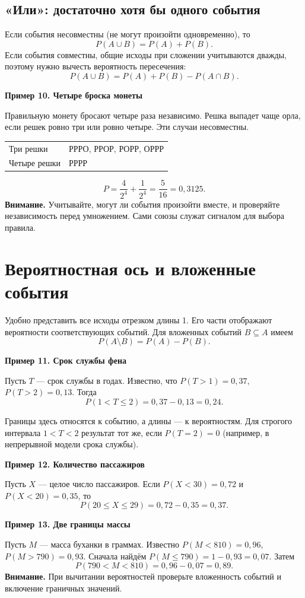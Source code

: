 \documentclass[a4paper,12pt]{article}
\newcommand{\example}[1]{\par\medskip\textcolor{darkaccent}{\textbf{#1}}\par}
\newcommand{\warning}[1]{\textcolor{warn}{\textbf{Внимание.}} #1}
\begin{document}
\subsection*{«Или»: достаточно хотя бы одного события}
Если события несовместны (не могут произойти одновременно), то
\[ P(A\cup B)=P(A)+P(B). \]
Если события совместны, общие исходы при сложении учитываются дважды, поэтому нужно вычесть вероятность пересечения:
\[ P(A\cup B)=P(A)+P(B)-P(A\cap B). \]
\example{Пример 10. Четыре броска монеты}
Правильную монету бросают четыре раза независимо. Решка выпадет чаще орла, если решек ровно три или ровно четыре. Эти случаи несовместны.
\begin{center}
\begin{tabular}{@{}ll@{}}
\toprule
Три решки & РРРО, РРОР, РОРР, ОРРР\\
Четыре решки & РРРР\\
\bottomrule
\end{tabular}
\end{center}
\[ P=\frac4{2^4}+\frac1{2^4}=\frac5{16}=0,3125. \]
\warning{Учитывайте, могут ли события произойти вместе, и проверяйте независимость перед умножением. Сами союзы служат сигналом для выбора правила.}

\clearpage
\section{Вероятностная ось и вложенные события}
Удобно представить все исходы отрезком длины 1. Его части отображают вероятности соответствующих событий. Для вложенных событий $B\subseteq A$ имеем
\[ P(A\setminus B)=P(A)-P(B). \]
\example{Пример 11. Срок службы фена}
Пусть $T$ --- срок службы в годах. Известно, что $P(T>1)=0,37$, $P(T>2)=0,13$. Тогда
\[ P(1<T\le2)=0,37-0,13=0,24. \]
\begin{center}
\end{center}
Границы здесь относятся к событию, а длины --- к вероятностям. Для строгого интервала $1<T<2$ результат тот же, если $P(T=2)=0$ (например, в непрерывной модели срока службы).
\example{Пример 12. Количество пассажиров}
Пусть $X$ --- целое число пассажиров. Если $P(X<30)=0,72$ и $P(X<20)=0,35$, то
\[ P(20\le X\le29)=0,72-0,35=0,37. \]
\example{Пример 13. Две границы массы}
Пусть $M$ --- масса буханки в граммах. Известно $P(M<810)=0,96$, $P(M>790)=0,93$. Сначала найдём $P(M\le790)=1-0,93=0,07$. Затем
\[ P(790<M<810)=0,96-0,07=0,89. \]
\warning{При вычитании вероятностей проверьте вложенность событий и включение граничных значений.}
\end{document}

